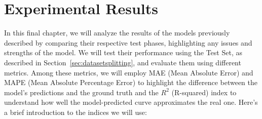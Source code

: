 \chapter{Experimental Results}
In this final chapter, we will analyze the results of the
models previously described by comparing their respective
test phases, highlighting any issues and strengths of the model.
We will test their performance using the Test Set,
as described in Section~\ref{sec:datasetsplitting}, and
evaluate them using different metrics.
Among these metrics, we will employ MAE (Mean Absolute Error) and MAPE (Mean Absolute Percentage Error) \cite{metrics}
to highlight the difference between the model's predictions and
the ground truth and the $R^2$ (R-squared) \cite{metrics} index to understand how well
the model-predicted curve approximates the real one.
Here's a brief introduction to the indices we will use:


